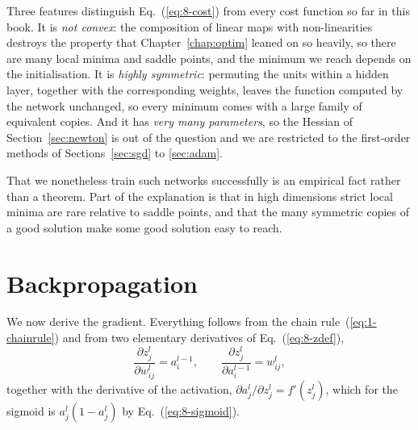 Three features distinguish Eq.~(\ref{eq:8-cost}) from every cost function so
far in this book.  It is \emph{not convex}: the composition of linear maps with
non-linearities destroys the property that Chapter~\ref{chap:optim} leaned on
so heavily, so there are many local minima and saddle points, and the minimum
we reach depends on the initialisation.  It is \emph{highly symmetric}:
permuting the units within a hidden layer, together with the corresponding
weights, leaves the function computed by the network unchanged, so every
minimum comes with a large family of equivalent copies.  And it has \emph{very
many parameters}, so the Hessian of Section~\ref{sec:newton} is out of the
question and we are restricted to the first-order methods of
Sections~\ref{sec:sgd} to \ref{sec:adam}.

That we nonetheless train such networks successfully is an empirical fact
rather than a theorem.  Part of the explanation is that in high dimensions
strict local minima are rare relative to saddle points, and that the many
symmetric copies of a good solution make some good solution easy to reach.

\section{Backpropagation}
\label{sec:backprop}

We now derive the gradient.  Everything follows from the chain
rule~(\ref{eq:1-chainrule}) and from two elementary derivatives of
Eq.~(\ref{eq:8-zdef}),
\begin{equation}
  \frac{\partial z_j^{l}}{\partial w_{ij}^{l}} = a_i^{l-1},
  \qquad
  \frac{\partial z_j^{l}}{\partial a_i^{l-1}} = w_{ij}^{l},
  \label{eq:8-zderivs}
\end{equation}
together with the derivative of the activation,
$\partial a_j^{l}/\partial z_j^{l}=f'(z_j^{l})$, which for the sigmoid is
$a_j^{l}(1-a_j^{l})$ by Eq.~(\ref{eq:8-sigmoid}).

